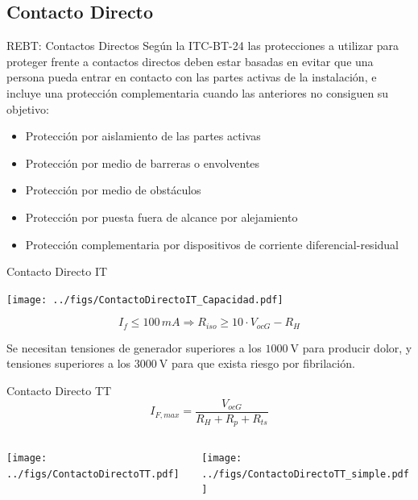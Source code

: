 \documentclass[aspectratio=169, usenames,svgnames,dvipsnames]{beamer}
\begin{document}
\subsection{Contacto Directo}
\label{sec:orge557290}

\begin{frame}[label={sec:org5b4431f}]{REBT: Contactos Directos}
Según la ITC-BT-24 las protecciones a utilizar para proteger frente a
contactos directos deben estar \alert{basadas en evitar que una persona pueda
entrar en contacto con las partes activas} de la instalación, e incluye
una protección complementaria cuando las anteriores no consiguen su
objetivo:

\begin{itemize}
\item Protección por \alert{aislamiento de las partes activas}

\item Protección por medio de \alert{barreras o envolventes}

\item Protección por medio de \alert{obstáculos}

\item Protección por puesta \alert{fuera de alcance} por alejamiento

\item Protección complementaria por \alert{dispositivos de corriente
diferencial}-residual
\end{itemize}
\end{frame}


\begin{frame}[label={sec:org72a1ee8}]{Contacto Directo IT}
\begin{center}
\texttt{[image: ../figs/ContactoDirectoIT\_Capacidad.pdf]}
\end{center}

$$I_{f}\leq100\, mA\Longrightarrow R_{iso}\geq10\cdot V_{ocG}-R_{H}$$

Se necesitan tensiones de generador superiores a los \(\SI{1000}{\volt}\)
para producir dolor, y tensiones superiores a los \(\SI{3000}{\volt}\)
para que exista riesgo por fibrilación.
\end{frame}

\begin{frame}[label={sec:org84b44ce}]{Contacto Directo TT}
$$I_{F,max}=\frac{V_{ocG}}{R_{H}+R_{p}+R_{ts}}$$

\begin{columns}
\begin{column}{0.5\columnwidth}
\begin{center}
\texttt{[image: ../figs/ContactoDirectoTT.pdf]}
\end{center}
\end{column}

\begin{column}{0.5\columnwidth}
\begin{center}
\texttt{[image: ../figs/ContactoDirectoTT\_simple.pdf]}
\end{center}
\end{column}
\end{columns}
\end{frame}
\end{document}

